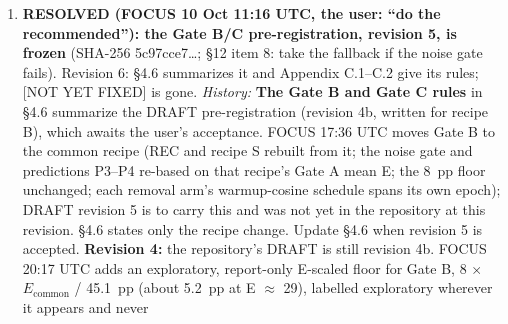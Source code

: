 \documentclass{article}
\theoremstyle{plain}
\theoremstyle{definition}
\theoremstyle{remark}
\begin{document}
\begin{enumerate}
        deadlines are ESTIMATED, not official: about 16 Jan 2027 (abstract) and
        about 22 Jan 2027 (paper), AoE, from a third-party tracker; the ICML
        2027 call is not published (literature sweep \S{}6, checked 16 Oct about
        21:20 UTC). Plan to the ICML 2026 rules until then: 8 pages of main
        body; references, the Impact Statement and appendices outside the limit;
        one more page at camera-ready; the Impact Statement required (added in
        revision 6). The body measures 7.96 pages to the Impact Statement and
        8.15 to the References heading (revision 5e: 9.36). Swap to the 2027
        style when it is released and re-check the limit and the statement.
        \emph{History:} the adopted amendment targeted TMLR or NeurIPS 2027;
        ICML 2027 only if, by about 1 December, the planted sweep, both 1B
        families and one 7--8B published-setting replication are funded. The
        LaTeX build uses the ICML 2026 style; see the page count in the build
        log. NeurIPS allows 9 pages; TMLR has no strict limit. ICML needs an
        Impact Statement (missing). \textbf{Revision 5:} the main body measures
        9.40 pages (the measure in ``What changed in revision 5''), over ICML's
        8 pages and NeurIPS's 9.
  \item \textbf{RESOLVED (FOCUS 10 Oct 11:16 UTC, the user: ``do the
        recommended''): the Gate B/C pre-registration, revision 5, is frozen}
        (SHA-256 5c97cce7\ldots{}; \S{}12 item 8: take the fallback if the noise
        gate fails). Revision 6: \S{}4.6 summarizes it and Appendix C.1--C.2
        give its rules; [NOT YET FIXED] is gone. \emph{History:} \textbf{The
        Gate B and Gate C rules} in \S{}4.6 summarize the DRAFT pre-registration
        (revision 4b, written for recipe B), which awaits the user's acceptance.
        FOCUS 17:36 UTC moves Gate B to the common recipe (REC and recipe S
        rebuilt from it; the noise gate and predictions P3--P4 re-based on that
        recipe's Gate A mean E; the 8~pp floor unchanged; each removal arm's
        warmup-cosine schedule spans its own epoch); DRAFT revision 5 is to
        carry this and was not yet in the repository at this revision. \S{}4.6
        states only the recipe change. Update \S{}4.6 when revision 5 is
        accepted. \textbf{Revision 4:} the repository's DRAFT is still revision
        4b. FOCUS 20:17 UTC adds an exploratory, report-only E-scaled floor for
        Gate B, 8 $\times$ $E_{\mathrm{common}}$ / 45.1~pp (about 5.2~pp at E
        $\approx$ 29), labelled exploratory wherever it appears and never

\end{enumerate}
\end{document}
